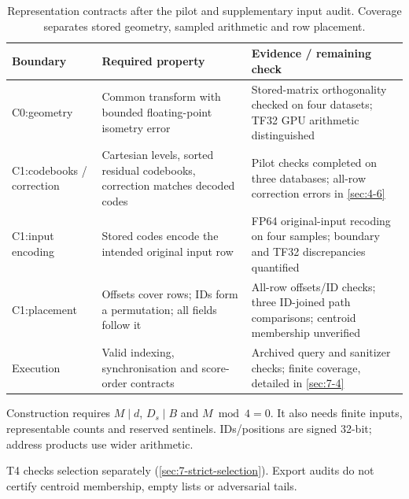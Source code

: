 \begin{table}[tbp]
\centering
\caption[Representation contracts and audit coverage]{Representation contracts after the pilot and supplementary input audit.
Coverage separates stored geometry, sampled arithmetic and row placement.}
\label{tab:4-contracts}
\footnotesize\setlength{\tabcolsep}{4pt}
\begin{tabularx}{\linewidth}{@{}>{\raggedright\arraybackslash}p{1.8cm}*{2}{>{\raggedright\arraybackslash}X}@{}}
\toprule
Boundary & Required property & Evidence / remaining check \\
\midrule
C0:\newline geometry & Common transform with bounded floating-point isometry error & Stored-matrix orthogonality checked on four datasets; TF32 GPU arithmetic distinguished \\
C1:\newline codebooks / correction & Cartesian levels, sorted residual codebooks, correction matches decoded codes & Pilot checks completed on three databases; all-row correction errors in \cref{sec:4-6} \\
C1:\newline input encoding & Stored codes encode the intended original input row & FP64 original-input recoding on four samples; boundary and TF32 discrepancies quantified \\
C1:\newline placement & Offsets cover rows; IDs form a permutation; all fields follow it & All-row offsets/ID checks; three ID-joined path comparisons; centroid membership unverified \\
Execution & Valid indexing, synchronisation and score-order contracts & Archived query and sanitizer checks; finite coverage, detailed in \cref{sec:7-4} \\
\bottomrule
\end{tabularx}
\end{table}

Construction requires $M\mid d$, $D_s\mid B$ and $M\bmod4=0$. It also needs finite inputs, representable counts and reserved sentinels. IDs/positions are signed 32-bit; address products use wider arithmetic.

T4 checks selection separately (\cref{sec:7-strict-selection}). Export audits do not certify centroid membership, empty lists or adversarial tails.